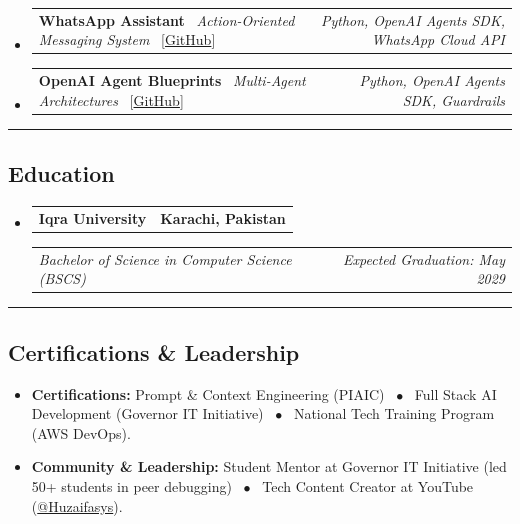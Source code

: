 \documentclass[11pt,letterpaper]{article}
\makeatletter
\newcommand{\headerrow}[2]
{\begin{tabular*}{\linewidth}{l@{\extracolsep{\fill}}r}
#1 &
#2 \\
\end{tabular*}}
\makeatother
\begin{document}
\begin{itemize}[leftmargin=1em]
	\item
	      \headerrow
	      {\textbf{WhatsApp Assistant} \textbar\ \emph{Action-Oriented Messaging System} \ {\small [\href{https://github.com/HezziCode/My-What-sApp-Agent}{GitHub}]}}
	      {\emph{Python, OpenAI Agents SDK, WhatsApp Cloud API}}

	\item
	      \headerrow
	      {\textbf{OpenAI Agent Blueprints} \textbar\ \emph{Multi-Agent Architectures} \ {\small [\href{https://github.com/HezziCode/Learn-Open-Ai-Agent-SDK}{GitHub}]}}
	      {\emph{Python, OpenAI Agents SDK, Guardrails}}
	      	      
\end{itemize}

\vspace{0.2em}
\hrule
\vspace{-0.8em}
\subsection*{\Large Education}

\begin{itemize}[leftmargin=1em]
	\parskip=0.1em
		
	\item
	      \headerrow
	      {\textbf{Iqra University}}
	      {\textbf{Karachi, Pakistan}}
	      \headerrow
	      {\emph{Bachelor of Science in Computer Science (BSCS)}}
	      {\emph{Expected Graduation: May 2029}}
	      	      
\end{itemize}

\vspace{0.2em}
\hrule
\vspace{-0.8em}
\subsection*{\Large Certifications \& Leadership}

\begin{itemize}[leftmargin=1em,noitemsep]
	\item \textbf{Certifications:} Prompt \& Context Engineering (PIAIC) \ $\bullet$ \ Full Stack AI Development (Governor IT Initiative) \ $\bullet$ \ National Tech Training Program (AWS DevOps).
	\item \textbf{Community \& Leadership:} Student Mentor at Governor IT Initiative (led 50+ students in peer debugging) \ $\bullet$ \ Tech Content Creator at YouTube (\href{https://youtube.com/@Huzaifasys}{@Huzaifasys}).
\end{itemize}
\end{document}
